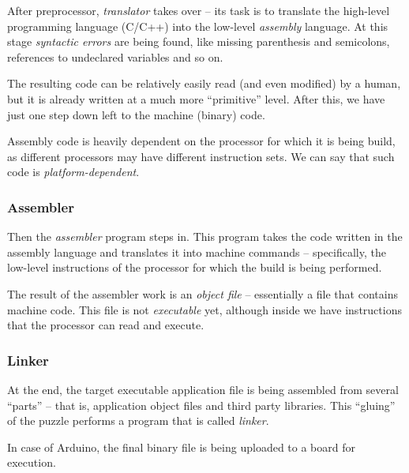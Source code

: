 \documentclass[../sparc.tex]{subfiles}
\begin{document}
After preprocessor, \emph{translator} takes over -- its task is to translate the
high-level programming language (C/C++) into the low-level \emph{assembly}
language.  At this stage \emph{syntactic errors} are being found, like missing
parenthesis and semicolons, references to undeclared variables and so on.

The resulting code can be relatively easily read (and even modified) by a human,
but it is already written at a much more ``primitive'' level.  After this, we
have just one step down left to the machine (binary) code.

Assembly code is heavily dependent on the processor for which it is being build,
as different processors may have different instruction sets.  We can say that
such code is \emph{platform-dependent}.

\subsubsection{Assembler}

Then the \emph{assembler} program steps in.  This program takes the code written
in the assembly language and translates it into machine commands -- specifically,
the low-level instructions of the processor for which the build is being
performed.

The result of the assembler work is an \emph{object file} -- essentially a file
that contains machine code.  This file is not \emph{executable} yet, although
inside we have instructions that the processor can read and execute.

\subsubsection{Linker}

At the end, the target executable application file is being assembled from
several ``parts'' -- that is, application object files and third party libraries.
This ``gluing'' of the puzzle performs a program that is called \emph{linker}.

In case of Arduino, the final binary file is being uploaded to a board for
execution.
\end{document}
